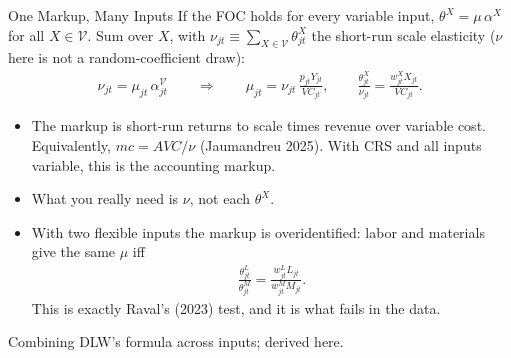 \documentclass[aspectratio=169,10pt]{beamer}
\begin{document}
\begin{frame}{One Markup, Many Inputs}
\small
If the FOC holds for every variable input, $\theta^X = \mu\, \alpha^X$ for all $X \in \mathcal{V}$. Sum over $X$, with $\nu_{jt} \equiv \sum_{X \in \mathcal{V}} \theta^X_{jt}$ the short-run scale elasticity ($\nu$ here is not a random-coefficient draw):
\begin{align*}
\nu_{jt} = \mu_{jt}\, \alpha^{\mathcal{V}}_{jt}
\qquad\Longrightarrow\qquad
\boxed{\mu_{jt} = \nu_{jt}\, \frac{p_{jt} Y_{jt}}{VC_{jt}}},
\qquad \frac{\theta^X_{jt}}{\nu_{jt}} = \frac{w^X_{jt} X_{jt}}{VC_{jt}}.
\end{align*}
\begin{itemize}
\item The markup is short-run returns to scale times revenue over variable cost. Equivalently, $mc = AVC/\nu$ (Jaumandreu 2025). With CRS and all inputs variable, this is the accounting markup.
\item What you really need is $\nu$, not each $\theta^X$.
\item With two flexible inputs the markup is \alert{overidentified}: labor and materials give the same $\mu$ iff
\begin{align*}
\frac{\theta^L_{jt}}{\theta^M_{jt}} = \frac{w^L_{jt} L_{jt}}{w^M_{jt} M_{jt}}.
\end{align*}
This is exactly Raval's (2023) test, and it is what fails in the data.
\end{itemize}
{\footnotesize Combining DLW's formula across inputs; derived here.}
\end{frame}
\end{document}
